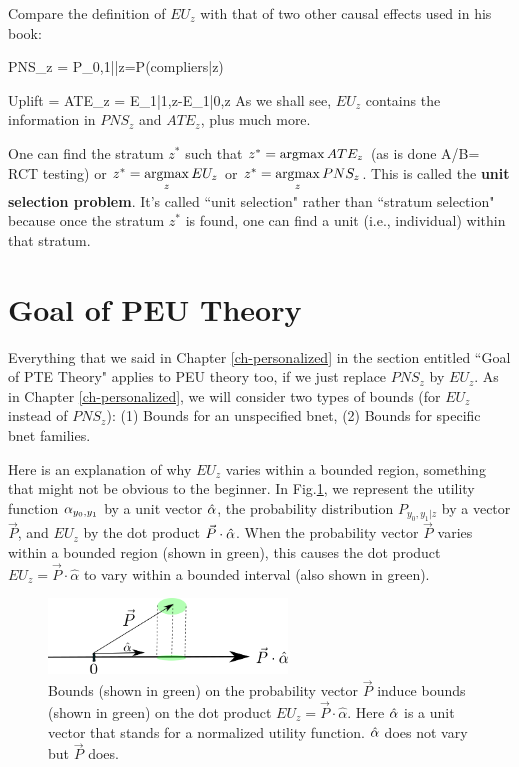 Compare the definition of $EU_z$
with that of two other causal effects used 
in his book:

\beq
PNS_z = P_{0,1||z}=P(compliers|z)
\eeq

\beq
Uplift = ATE_z = E_{1|1,z}-E_{1|0,z}
\eeq
As we shall see,
$EU_z$ contains the information
in $PNS_z$ and $ATE_z$,  plus much more.

 
One can
find the stratum $z^*$
such that
$z^*=\mathop{\mathrm{argmax}}\limits ATE_z$ (as is done A/B= RCT testing) or
 $z^*=\mathop{\mathrm{argmax}}\limits_z EU_z$ or
$z^*=\mathop{\mathrm{argmax}}\limits_z PNS_z$.
This is called the
{\bf unit selection problem}.
It's called ``unit selection"
rather than ``stratum selection" 
because once the  
stratum $z^*$ is found,
one can find a unit 
(i.e., individual) within
that stratum.







\section{Goal of PEU Theory}
Everything that we said 
in Chapter \ref{ch-personalized}
in the section entitled ``Goal 
of PTE Theory"
applies to PEU theory too,
if we just replace $PNS_z$
by $EU_z$.
As in Chapter \ref{ch-personalized}, 
we will consider two types of bounds (for
$EU_z$ instead of $PNS_z$): 
(1) Bounds for an unspecified bnet,
(2) Bounds for specific bnet families.


Here is
an explanation 
of why $EU_z$
varies within a bounded region,
something that might 
not be obvious to the beginner.
In  Fig.\ref{fig-peu-utility},
we represent the utility
function $\alpha_{y_0, y_1}$
by a unit vector $\hat{\alpha}$,
the probability distribution 
$P_{y_0, y_1|z}$ by a vector $\vec{P}$,
and $EU_z$ by the dot product 
$\vec{P}\cdot \hat{\alpha}$.
When the probability
vector $\vec{P}$ varies within a bounded region
(shown in green),
this causes
the dot 
product $EU_z=\vec{P}\cdot \hat{\alpha}$
to vary within a bounded interval (also
shown in green).



\begin{figure}[h!]
\centering
\includegraphics[width=2.5in]
{personalized-test/utility.png}
\caption{Bounds (shown in green)
on the probability
vector $\vec{P}$
induce bounds (shown in green) on the dot 
product $EU_z=\vec{P}\cdot \hat{\alpha}$.
Here $\hat{\alpha}$ is a unit vector
that stands for a normalized 
utility function. $\hat{\alpha}$ 
does not vary but $\vec{P}$ does.
} 
\label{fig-peu-utility}
\end{figure}

